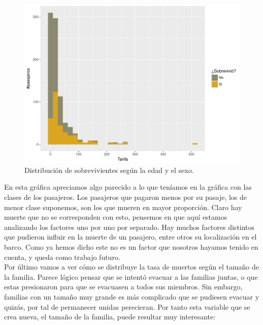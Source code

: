 \documentclass[10pt,a4paper]{article}
\begin{document}
\begin{figure}[H]
  \centering
  \includegraphics[width=\textwidth]{imgs/fare.pdf}
  \caption{Distribución de sobrevivientes según la edad y el sexo.}
\end{figure}

En esta gráfica apreciamos algo parecido a lo que teníamos en la gráfica con las clases de los pasajeros. Los pasajeros que pagaron menos por su pasaje, los de menor clase suponemos, son los que mueren en mayor proporción. Claro hay muerte que no se corresponden con esto, pensemos en que aquí estamos analizando los factores uno por uno por separado. Hay muchos factores distintos que pudieron influir en la muerte de un pasajero, entre otros su localización en el barco. Como ya hemos dicho este no es un factor que nosotros hayamos tenido en cuenta, y queda como trabajo futuro.\\

Por último vamos a ver cómo se distribuye la tasa de muertos según el tamaño de la familia. Parece lógico pensar que se intentó evacuar a las familias juntas, o que estas presionaron para que se evacuasen a todos sus miembros. Sin embargo, familias con un tamaño muy grande es más complicado que se pudiesen evacuar y quizás, por tal de permanecer unidas perecieran. Por tanto esta variable que se crea nueva, el tamaño de la familia, puede resultar muy interesante:
\end{document}
